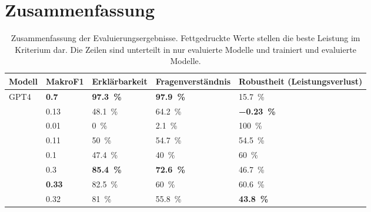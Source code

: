 \section{Zusammenfassung}\label{sec:results:summary}

\begin{table}
    \centering
    \begin{adjustbox}{width=\textwidth,center}
        \begin{tabular}{lllll}
            \toprule
            \textbf{Modell} & \textbf{MakroF1}                   & \textbf{Erklärbarkeit}                      & \textbf{Fragenverständnis}                  & \textbf{Robustheit (Leistungsverlust)}       \\
            \midrule
            GPT4            & \textbf{\num[detect-weight]{0.7}}  & \textbf{\SI[detect-weight]{97.3}{\percent}} & \textbf{\SI[detect-weight]{97.9}{\percent}} & \SI{15.7}{\percent}                          \\
            \lo{}           & \num{0.13}                         & \SI{48.1}{\percent}                         & \SI{64.2}{\percent}                         & \textbf{\SI[detect-weight]{-0.23}{\percent}} \\
            \midrule
            \liv{}          & \num{0.01}                         & \SI{0}{\percent}                            & \SI{2.1}{\percent}                          & \SI{100}{\percent}                           \\
            \lia{}          & \num{0.11}                         & \SI{50}{\percent}                           & \SI{54.7}{\percent}                         & \SI{54.5}{\percent}                          \\
            \lev{}          & \num{0.1}                          & \SI{47.4}{\percent}                         & \SI{40}{\percent}                           & \SI{60}{\percent}                            \\
            \lea{}          & \num{0.3}                          & \textbf{\SI[detect-weight]{85.4}{\percent}} & \textbf{\SI[detect-weight]{72.6}{\percent}} & \SI{46.7}{\percent}                          \\
            \lsa{}          & \textbf{\num[detect-weight]{0.33}} & \SI{82.5}{\percent}                         & \SI{60}{\percent}                          & \SI{60.6}{\percent}                          \\
            \lioa{}         & \num{0.32}                         & \SI{81}{\percent}                           & \SI{55.8}{\percent}                         & \textbf{\SI[detect-weight]{43.8}{\percent}}  \\
            \bottomrule
        \end{tabular}
    \end{adjustbox}
        \caption[Zusammenfassung der Evaluierungsergebnisse]{Zusammenfassung der Evaluierungsergebnisse. Fettgedruckte Werte stellen die beste Leistung im Kriterium dar. Die Zeilen sind unterteilt in nur evaluierte Modelle und trainiert und evaluierte Modelle. }\label{tab:results:summary}
    \end{table}
    
